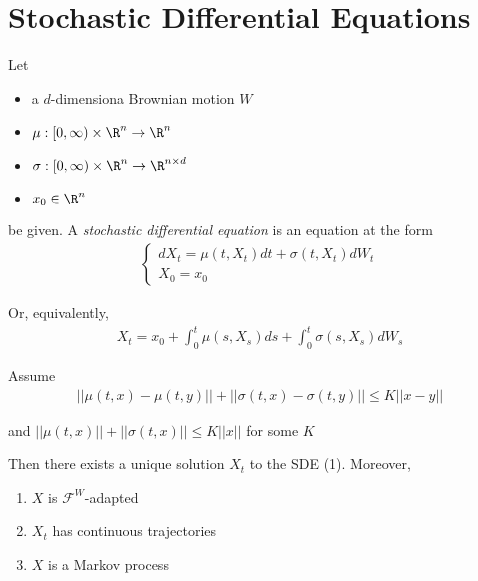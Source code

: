 \section{Stochastic Differential Equations}
Let\par
\begin{itemize}
  \item a $d$-dimensiona Brownian motion $W$
  \item $\mu:[0,\infty)\times\R^n\to\R^n$
  \item $\sigma:[0,\infty)\times\R^n\to\R^{n\times d}$
  \item $x_0\in\R^n$
\end{itemize} be given. A \textit{stochastic differential equation} is an equation at the form
\begin{equation}
  \begin{gathered}
    \begin{cases}
      dX_t = \mu(t,X_t)dt +\sigma(t,X_t)dW_t\\
      X_0 = x_0
    \end{cases}
  \end{gathered}
\end{equation}\par
\noindent Or, equivalently, 
\begin{equation*}
  \begin{gathered}
    X_t = x_0+\int_{0}^{t}\mu(s,X_s)ds + \int_{0}^{t}\sigma(s,X_s)dW_s
  \end{gathered}
\end{equation*}
\par\bigskip
\begin{theo}[]{}
  Assume 
  \begin{equation*}
    \begin{gathered}
      \left|\left|\mu(t,x)-\mu(t,y)\right|\right|+\left|\left|\sigma(t,x)-\sigma(t,y)\right|\right|\leq K\left|\left|x-y\right|\right|
    \end{gathered}
  \end{equation*}\par
  \noindent and $\left|\left|\mu(t,x)\right|\right|+\left|\left|\sigma(t,x)\right|\right|\leq K\left|\left|x\right|\right|$ for some $K$
  \par\bigskip
  \noindent Then there exists a unique solution $X_t$ to the SDE (1). Moreover,\par
  \begin{enumerate}[leftmargin=*]
    \item $X$ is $\mathcal{F}^W$-adapted
    \item $X_t$ has continuous trajectories
    \item $X$ is a Markov process
  \end{enumerate}
\end{theo}
\par\bigskip
